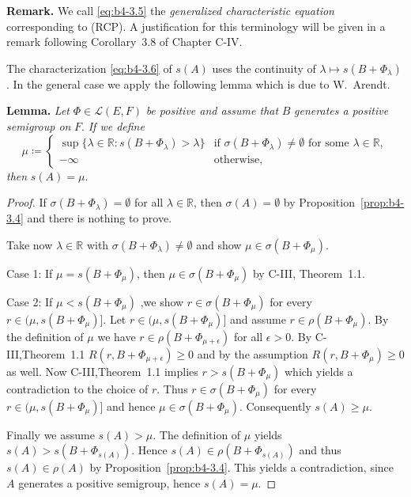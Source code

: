 \medskip\noindent
\textbf{Remark.}
	We call \eqref{eq:b4-3.5} the \emph{generalized characteristic equation} corresponding to (RCP). 
	A justification for this terminology will be given in a remark following Corollary~3.8 of Chapter C-IV.

The characterization \eqref{eq:b4-3.6} of $s(A)$ uses the continuity of $\lambda \mapsto s(B + \Phi_{\lambda})$. 
In the general case we apply the following lemma which is due to W.\ Arendt.

\medskip\noindent
\textbf{Lemma.} 
	\textit{Let } $\Phi \in \mathcal{L}(E,F)$ \textit{ be positive and assume that } $B$ \textit{ generates a positive semigroup on } $F$. 
	\textit{ If we define}
	\[
	\mu \coloneq 
	\begin{cases}
		\sup\{\lambda \in \mathbb{R} \colon s(B+\Phi_{\lambda}) > \lambda\} & \text{if } \sigma(B+\Phi_{\lambda}) \neq \emptyset \text{ for some } \lambda \in \mathbb{R}, \\
		-\infty & \text{otherwise},
	\end{cases}
	\]
	\textit{then } $s(A) = \mu$.
	

\begin{proof}
	If $\sigma(B+\Phi_{\lambda}) = \emptyset$ for all $\lambda \in \mathbb{R}$, then $\sigma(A) = \emptyset$ by Proposition~\ref{prop:b4-3.4} and there is nothing to prove.
	
	Take now $\lambda \in \mathbb{R}$ with $\sigma(B+\Phi_{\lambda}) \neq \emptyset$ and show $\mu \in \sigma(B+\Phi_{\mu})$.
	
	Case 1: If $\mu = s(B+\Phi_{\mu})$, then $\mu \in \sigma(B+\Phi_{\mu})$ by C-III, Theorem~1.1.
	
	Case 2: If $\mu < s(B+\Phi_{\mu})$ ,we show $r \in \sigma(B+\Phi_{\mu})$ for every $r \in (\mu,s(B+\Phi_{\mu})]$.
%
%
Let $r \in (\mu,s(B+\Phi_{\mu})]$ and assume $r \in \rho(B+\Phi_{\mu})$. 
By the definition of $\mu$ we have $r \in \rho(B+\Phi_{\mu+\epsilon})$ for all $\epsilon > 0$. 
By C-III,Theorem~1.1 $R(r,B+\Phi_{\mu+\epsilon}) \geq 0$ and by the assumption $R(r,B+\Phi_{\mu}) \geq 0$ as well. 
Now C-III,Theorem~1.1 implies $r > s(B+\Phi_{\mu})$ which yields a contradiction to the choice of $r$. 
Thus $r \in \sigma(B+\Phi_{\mu})$ for every $r \in (\mu,s(B+\Phi_{\mu})]$ and hence $\mu \in \sigma(B+\Phi_{\mu})$. 
Consequently $s(A) \geq \mu$.

Finally we assume $s(A) > \mu$. 
The definition of $\mu$ yields $s(A) > s(B+\Phi_{s(A)})$. 
Hence $s(A) \in \rho(B+\Phi_{s(A)})$ and thus $s(A) \in \rho(A)$ by Proposition~\ref{prop:b4-3.4}. 
This yields a contradiction, since $A$ generates a positive semigroup, hence $s(A) = \mu$.
\end{proof}

